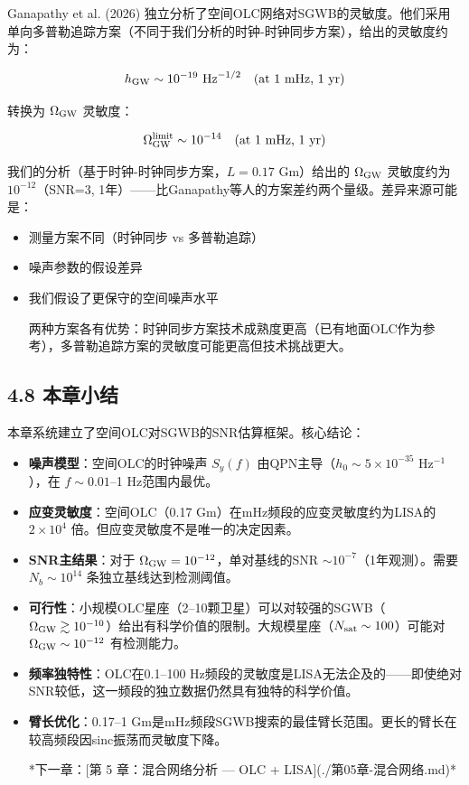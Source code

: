 \documentclass[12pt,a4paper]{article}
\begin{document}
Ganapathy et al. (2026) 独立分析了空间OLC网络对SGWB的灵敏度\cite{ref11}。他们采用单向多普勒追踪方案（不同于我们分析的时钟-时钟同步方案），给出的灵敏度约为：

$$h_{\rm GW} \sim 10^{-19} \ {\rm Hz}^{-1/2} \quad (\text{at } 1\text{ mHz, 1 yr})$$

转换为 $\Omega_{\rm GW}$ 灵敏度：

$$\Omega_{\rm GW}^{\rm limit} \sim 10^{-14} \quad (\text{at } 1\text{ mHz, 1 yr})$$

我们的分析（基于时钟-时钟同步方案，$L = 0.17$ Gm）给出的 $\Omega_{\rm GW}$ 灵敏度约为 $10^{-12}$（SNR=3, 1年）——比Ganapathy等人的方案差约两个量级。差异来源可能是：
\begin{itemize}
  \item[1] 测量方案不同（时钟同步 vs 多普勒追踪）
  \item[2] 噪声参数的假设差异
  \item[3] 我们假设了更保守的空间噪声水平

两种方案各有优势：时钟同步方案技术成熟度更高（已有地面OLC作为参考），多普勒追踪方案的灵敏度可能更高但技术挑战更大。

\end{itemize}
\subsection{4.8 本章小结}


本章系统建立了空间OLC对SGWB的SNR估算框架。核心结论：

\begin{itemize}
  \item[1] \textbf{噪声模型}：空间OLC的时钟噪声 $S_y(f)$ 由QPN主导（$h_0 \sim 5 \times 10^{-35}$ Hz$^{-1}$），在 $f \sim 0.01$–1 Hz范围内最优。

  \item[2] \textbf{应变灵敏度}：空间OLC（0.17 Gm）在mHz频段的应变灵敏度约为LISA的 $2 \times 10^4$ 倍。但应变灵敏度不是唯一的决定因素。

  \item[3] \textbf{SNR主结果}：对于 $\Omega_{\rm GW} = 10^{-12}$，单对基线的SNR $\sim 10^{-7}$（1年观测）。需要 $N_b \sim 10^{14}$ 条独立基线达到检测阈值。

  \item[4] \textbf{可行性}：小规模OLC星座（2–10颗卫星）可以对较强的SGWB（$\Omega_{\rm GW} \gtrsim 10^{-10}$）给出有科学价值的限制。大规模星座（$N_{\rm sat} \sim 100$）可能对 $\Omega_{\rm GW} \sim 10^{-12}$ 有检测能力。

  \item[5] \textbf{频率独特性}：OLC在0.1–100 Hz频段的灵敏度是LISA无法企及的——即使绝对SNR较低，这一频段的独立数据仍然具有独特的科学价值。

  \item[6] \textbf{臂长优化}：0.17–1 Gm是mHz频段SGWB搜索的最佳臂长范围。更长的臂长在较高频段因sinc振荡而灵敏度下降。


*下一章：[第 5 章：混合网络分析 — OLC + LISA](./第05章-混合网络.md)*

\end{itemize}
\end{document}
